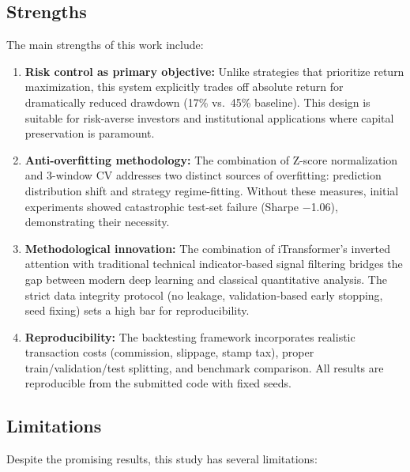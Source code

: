 \documentclass[12pt, a4paper]{article}
\begin{document}
\subsection{Strengths}

The main strengths of this work include:

\begin{enumerate}[leftmargin=2em]
    \item \textbf{Risk control as primary objective:} Unlike strategies that prioritize return maximization, this system explicitly trades off absolute return for dramatically reduced drawdown (17\% vs.\ 45\% baseline). This design is suitable for risk-averse investors and institutional applications where capital preservation is paramount.
    
    \item \textbf{Anti-overfitting methodology:} The combination of Z-score normalization and 3-window CV addresses two distinct sources of overfitting: prediction distribution shift and strategy regime-fitting. Without these measures, initial experiments showed catastrophic test-set failure (Sharpe $-$1.06), demonstrating their necessity.
    
    \item \textbf{Methodological innovation:} The combination of iTransformer's inverted attention with traditional technical indicator-based signal filtering bridges the gap between modern deep learning and classical quantitative analysis. The strict data integrity protocol (no leakage, validation-based early stopping, seed fixing) sets a high bar for reproducibility.
    
    \item \textbf{Reproducibility:} The backtesting framework incorporates realistic transaction costs (commission, slippage, stamp tax), proper train/validation/test splitting, and benchmark comparison. All results are reproducible from the submitted code with fixed seeds.
\end{enumerate}

\subsection{Limitations}

Despite the promising results, this study has several limitations:
\end{document}
